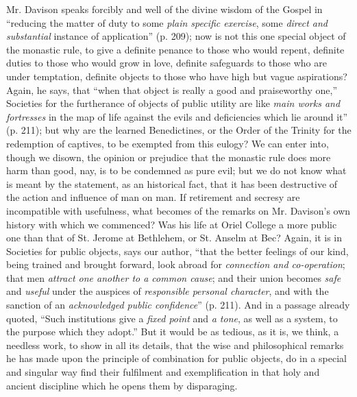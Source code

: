 Mr. Davison speaks forcibly and well of the
divine wisdom of the Gospel in ``reducing the matter of duty to some \emph{plain
specific exercise}, some \emph{direct and substantial} instance of
application'' (p. 209); now is not this one special object of the
monastic rule, to give a definite penance to those who would repent,
definite duties to those who would grow in love, definite safeguards
to those who are under temptation, definite objects to those who have
high but vague aspirations? Again, he says, that ``when that object is
really a good and praiseworthy one,'' Societies for the furtherance of
objects of public utility are like \emph{main works and fortresses} in
the map of life against the evils and deficiencies which lie around it''
(p. 211); but why are the learned Benedictines, or the Order of the
Trinity for the redemption of captives, to be exempted from this
eulogy? We can enter into, though we disown, the opinion or prejudice
that the monastic rule does more harm than good, nay, is to be
condemned as pure evil; but we do not know what is meant by the
statement, as an historical fact, that it has been destructive of the
action and influence of man on man. If retirement and secresy are
incompatible with usefulness, what becomes of the remarks on Mr.
Davison's own history with which we commenced? Was his life at Oriel
College a more public one than that of St. Jerome at Bethlehem, or St.
Anselm at Bec? Again, it is in Societies for public objects, says our
author, ``that the better feelings of our kind, being trained and
brought forward, look abroad for \emph{connection and co-operation};
that men \emph{attract one another to a common cause}; and their union
becomes \emph{safe} and \emph{useful} under the auspices of \emph{responsible
personal character}, and with the sanction of an \emph{acknowledged
public confidence}'' (p. 211). And in a passage already quoted, ``Such
institutions give a \emph{fixed point} and \emph{a tone}, as well as a
system, to the purpose which they adopt.'' But it would be as tedious,
as it is, we think, a needless work, to show in all its details, that
the wise and philosophical remarks he has made upon the principle of
combination for public objects, do in a special and singular way find
their fulfilment and exemplification in that holy and ancient
discipline which he opens them by disparaging.

